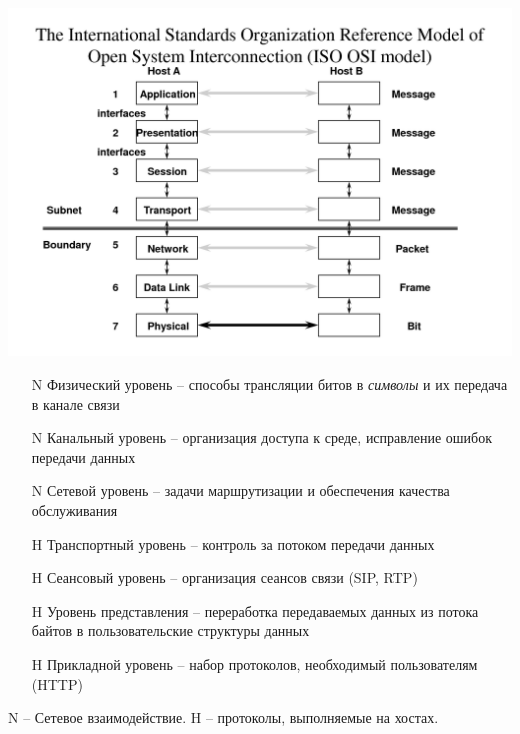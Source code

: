 \documentclass[utf8]{beamer}
\begin{document}
\begin{frame}
\begin{center}
\includegraphics[width=1.\textwidth]{pic/osi.png}
\end{center}
\end{frame}
\begin{frame}
\small
\begin{itemize}
 \item[N] Физический уровень -- способы трансляции битов в \emph{символы} и их передача в канале связи
 \item[N] Канальный уровень -- организация доступа к среде, исправление ошибок передачи данных
 \item[N] Сетевой уровень -- задачи маршрутизации и обеспечения качества обслуживания
 \item[H] Транспортный уровень -- контроль за потоком передачи данных
 \item[H] Сеансовый уровень -- организация сеансов связи (SIP, RTP)
 \item[H] Уровень представления -- переработка передаваемых данных из потока байтов в пользовательские структуры данных
 \item[H] Прикладной уровень -- набор протоколов, необходимый пользователям (HTTP)
\end{itemize}
N -- Сетевое взаимодействие.
H -- протоколы, выполняемые на хостах.
\end{frame}
\end{document}
